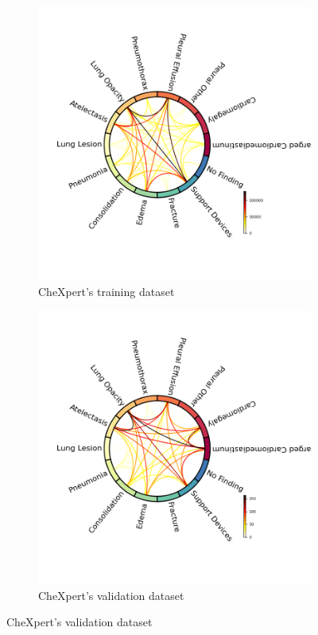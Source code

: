 \documentclass[11pt]{article}
\begin{document}
\begin{figure}[h!]
     \begin{subfigure}[b]{0.45\linewidth}
         \centering
         \includegraphics[width=\linewidth]{plots/chords_chexpert_train}
         \caption{CheXpert's training dataset}
         \vspace{4ex}
         \label{fig:chords_chexpert_train}
     \end{subfigure}
     \hfill
     \begin{subfigure}[b]{0.45\linewidth}
         \centering
         \includegraphics[width=\linewidth]{plots/chords_chexpert_valid}
         \caption{CheXpert's validation dataset}
         \vspace{4ex}
         \label{fig:chords_chexpert_valid}
     \end{subfigure}


\end{figure}
\end{document}
